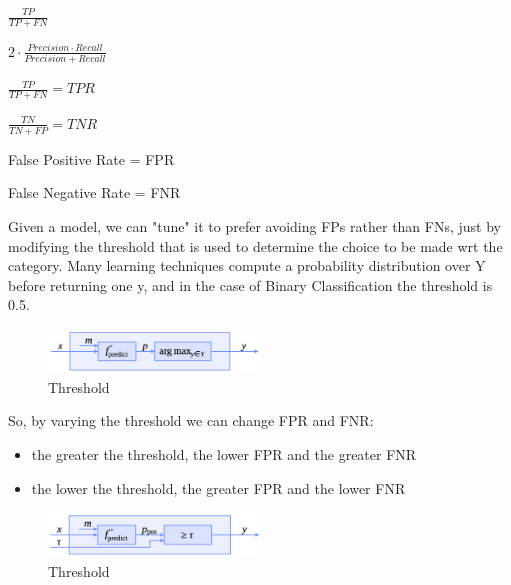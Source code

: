  $\frac{TP}{TP + FN}$

 $2 \cdot \frac{Precision \cdot Recall}{Precision + Recall}$

 $\frac{TP}{TP + FN} = TPR$

 $\frac{TN}{TN + FP} = TNR$

 False Positive Rate = FPR 

 False Negative Rate = FNR


Given a model, we can "tune" it to prefer avoiding FPs rather than FNs, just by modifying the threshold that is used to determine the choice to be made wrt the category.
Many learning techniques compute a probability distribution over Y before returning one y, and in the case of Binary Classification the threshold is 0.5. 

\begin{center}
    \begin{figure}[H]
        \centering
        \includegraphics[width=0.5\textwidth]{assets/fig6.png}
        \caption{Threshold}
    \end{figure}
\end{center}
\newpage
So, by varying the threshold we can change FPR and FNR:
\begin{itemize}
    \item the greater the threshold, the lower FPR and the greater FNR
    \item the lower the threshold, the greater FPR and the lower FNR
\end{itemize}

\begin{center}
    \begin{figure}[H]
        \centering
        \includegraphics[width=0.5\textwidth]{assets/fig7.png}
        \caption{Threshold}
    \end{figure}
\end{center}

